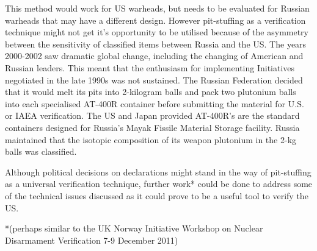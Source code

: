\documentclass[twoside,titlepage,11pt,twocolumn,a4paper]{article}
\begin{document}
\citep{matthew1998} This method would work for US warheads, but needs
to be evaluated for Russian warheads that may have a different
design. \citep{zarimpas2003} However pit-stuffing as a verification technique
might not get it's opportunity to be utilised because of the asymmetry
between the sensitivity of classified items between Russia and the
US. The years 2000-2002 saw dramatic global change, including the
changing of American and Russian leaders. This meant that the
enthusiasm for implementing Initiatives negotiated in the late 1990s
was not sustained. The Russian Federation decided that it would melt
its pits into 2-kilogram balls and pack two plutonium balls into each
specialised AT-400R container before submitting the material for
U.S. or IAEA verification. The US and Japan provided AT-400R's are the
standard containers designed for Russia's Mayak Fissile Material
Storage facility. Russia maintained that the isotopic composition of
its weapon plutonium in the 2-kg balls was classified. \citep{IPFN2008}

Although political decisions on declarations might stand in the way of
pit-stuffing as a universal verification technique, further work*
could be done to address some of the technical issues discussed as it
could prove to be a useful tool to verify the US.

*(perhaps similar to the UK Norway Initiative Workshop on Nuclear
Disarmament Verification 7-9 December 2011) 
\end{document}
